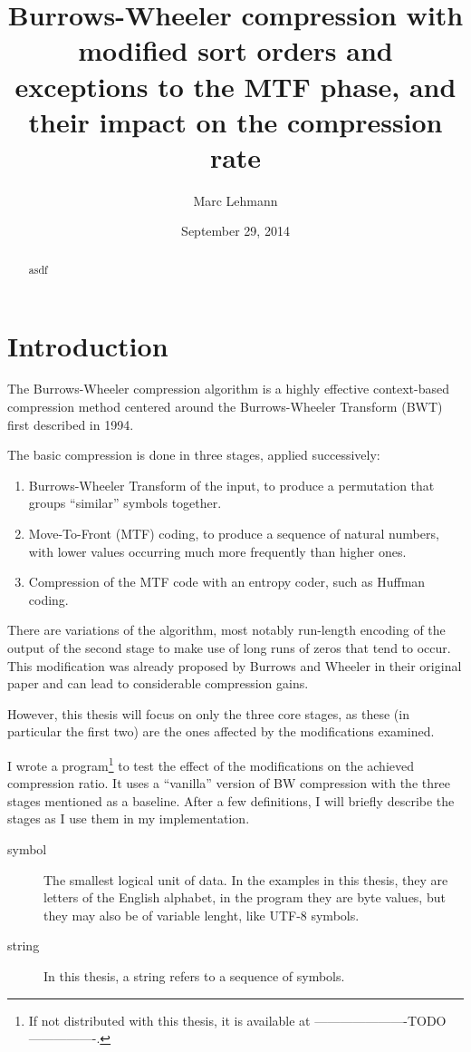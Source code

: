 \documentclass[a4paper]{scrreprt}
\title{Burrows-Wheeler compression with modified sort orders and exceptions to
the MTF phase, and their impact on the compression rate}
\date{September 29, 2014}
\author{Marc Lehmann}
\begin{document}
\maketitle

\begin{abstract}
asdf
\end{abstract}

\tableofcontents
\chapter{Introduction}

The Burrows-Wheeler compression algorithm is a highly effective context-based
compression method centered around the Burrows-Wheeler Transform (BWT) first
described in 1994\cite{burrowswheeler1994bwt}.

The basic compression is done in three stages, applied successively:
\begin{enumerate}
  \item Burrows-Wheeler Transform of the input, to produce a permutation that
  groups ``similar'' symbols together.
  \item Move-To-Front (MTF) coding, to produce a sequence of natural numbers,
  with lower values occurring much more frequently than higher ones.
  \item Compression of the MTF code with an entropy coder, such as Huffman
  coding.
\end{enumerate}
There are variations of the algorithm, most notably run-length encoding of the
output of the second stage to make use of long runs of zeros that tend to occur.
This modification was already proposed by Burrows and Wheeler in their original
paper and can lead to considerable compression gains.

However, this thesis will focus on only the three core stages, as these (in
particular the first two) are the ones affected by the modifications examined.

I wrote a program\footnote{If not distributed with this thesis, it is available
at ----------------------TODO----------------.} to test the effect of the
modifications on the achieved compression ratio. It uses a ``vanilla'' version
of BW compression with the three stages mentioned as a baseline. After a few
definitions, I will briefly describe the stages as I use them in my
implementation.

\begin{description}
\item[symbol] The smallest logical unit of data. In the examples in this thesis,
they are letters of the English alphabet, in the program they are byte values,
but they may also be of variable lenght, like UTF-8 symbols.
\item[string] In this thesis, a string refers to a sequence of symbols.
\end{description}
\end{document}
